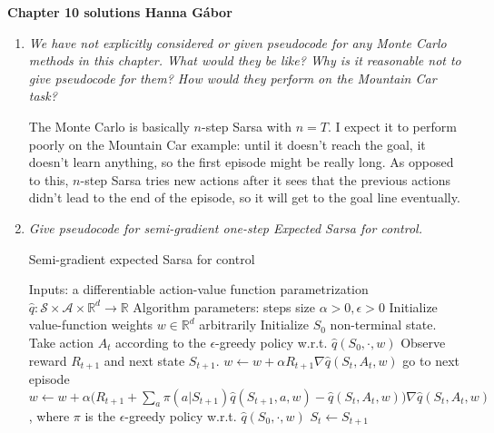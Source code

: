 \documentclass[12pt,a4paper]{article}
\begin{document}
\textbf{Chapter 10 solutions  \hfill Hanna Gábor}

\begin{enumerate}
  \item \textit{We have not explicitly considered or given pseudocode for any Monte Carlo
  methods in this chapter. What would they be like? Why is it reasonable not to give
  pseudocode for them? How would they perform on the Mountain Car task?}

  The Monte Carlo is basically $n$-step Sarsa with $n = T$. I expect it to perform
  poorly on the Mountain Car example: until it doesn't reach the goal, it doesn't
  learn anything, so the first episode might be really long.
  As opposed to this, $n$-step Sarsa tries new actions after it sees
  that the previous actions didn't lead to the end of the episode, so it will
  get to the goal line eventually.

  \item \textit{Give pseudocode for semi-gradient one-step Expected Sarsa for control.}

  \begin{algorithm}
    \caption{Semi-gradient expected Sarsa for control}
    \begin{algorithmic}
      \STATE Inputs: a differentiable action-value function parametrization
      $\hat{q}: \mathcal{S} \times \mathcal{A} \times \mathbb{R}^d \rightarrow \mathbb{R}$
      \STATE Algorithm parameters: steps size $\alpha > 0, \epsilon > 0$
      \STATE Initialize value-function weights $w \in \mathbb{R}^d$ arbitrarily
        \STATE Initialize $S_0$ non-terminal state.
          \STATE Take action $A_t$ according to the $\epsilon$-greedy policy w.r.t.
          $\hat{q}(S_0, \cdot, w)$
          \STATE Observe reward $R_{t + 1}$ and next state $S_{t + 1}$.
            \STATE $w \leftarrow w + \alpha R_{t + 1} \nabla\hat{q}(S_t, A_t, w)$
            \STATE go to next episode
          \ELSE
            \STATE $w \leftarrow w + \alpha\Big(R_{t + 1} + \sum\limits_a\pi(a|S_{t + 1})
            \hat{q}(S_{t + 1}, a, w) - \hat{q}(S_t, A_t, w)\Big)
            \nabla\hat{q}(S_t, A_t, w)$, where $\pi$ is the $\epsilon$-greedy policy w.r.t.
            $\hat{q}(S_0, \cdot, w)$
            \STATE $S_t \leftarrow S_{t + 1}$
          \ENDIF
        \ENDFOR
      \ENDFOR
    \end{algorithmic}
  \end{algorithm}


\end{enumerate}
\end{document}
